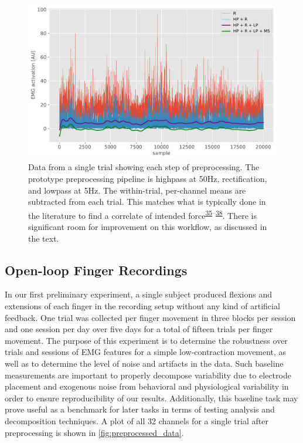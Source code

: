 \documentclass[
  a4paper,
]{article}
\begin{document}
\begin{figure}
\hypertarget{fig:preprocessing_steps}{%
\centering
\includegraphics[width=1\textwidth,height=\textheight]{images/data_analysis/fingers/preprocessing_steps.pdf}
\caption{Data from a single trial showing each step of preprocessing.
The prototype preprocessing pipeline is highpass at 50Hz, rectification,
and lowpass at 5Hz. The within-trial, per-channel means are subtracted
from each trial. This matches what is typically done in the literature
to find a correlate of intended
force\textsuperscript{\protect\hyperlink{ref-sangerBayesianFilteringMyoelectric2007}{35}--\protect\hyperlink{ref-sussillo2015}{38}}.
There is significant room for improvement on this workflow, as discussed
in the text.}\label{fig:preprocessing_steps}
}
\end{figure}

\hypertarget{open-loop-finger-recordings}{%
\subsection{Open-loop Finger
Recordings}\label{open-loop-finger-recordings}}

In our first preliminary experiment, a single subject produced flexions
and extensions of each finger in the recording setup without any kind of
artificial feedback. One trial was collected per finger movement in
three blocks per session and one session per day over five days for a
total of fifteen trials per finger movement. The purpose of this
experiment is to determine the robustness over trials and sessions of
EMG features for a simple low-contraction movement, as well as to
determine the level of noise and artifacts in the data. Such baseline
measurements are important to properly decompose variability due to
electrode placement and exogenous noise from behavioral and
physiological variability in order to ensure reproducibility of our
results. Additionally, this baseline task may prove useful as a
benchmark for later tasks in terms of testing analysis and decomposition
techniques. A plot of all 32 channels for a single trial after
preprocessing is shown in \cref{fig:preprocessed_data}.
\end{document}
